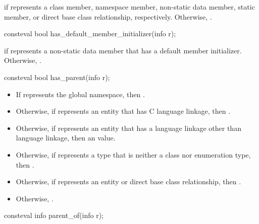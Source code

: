 \begin{itemdescr}
\pnum
\returns
{} if  represents a
class member,
namespace member,
non-static data member,
static member, or
direct base class relationship, respectively.
Otherwise, .
\end{itemdescr}

%
\begin{itemdecl}
consteval bool has_default_member_initializer(info r);
\end{itemdecl}

\begin{itemdescr}
\pnum
\returns
{} if  represents a non-static data member
that has a default member initializer.
Otherwise, .
\end{itemdescr}

%
\begin{itemdecl}
consteval bool has_parent(info r);
\end{itemdecl}

\begin{itemdescr}
\pnum
\returns
\begin{itemize}
\item
  If  represents the global namespace,
  then .
\item
  Otherwise, if  represents an entity that has C language linkage,
  then .
\item
  Otherwise, if  represents an entity that has a
  language linkage other than \Cpp{} language linkage,
  then an
  value.
\item
  Otherwise, if  represents a type that is neither a class nor enumeration type,
  then .
\item
  Otherwise, if  represents an entity or direct base class relationship,
  then .
\item
  Otherwise, .
\end{itemize}
\end{itemdescr}

%
\begin{itemdecl}
consteval info parent_of(info r);
\end{itemdecl}

